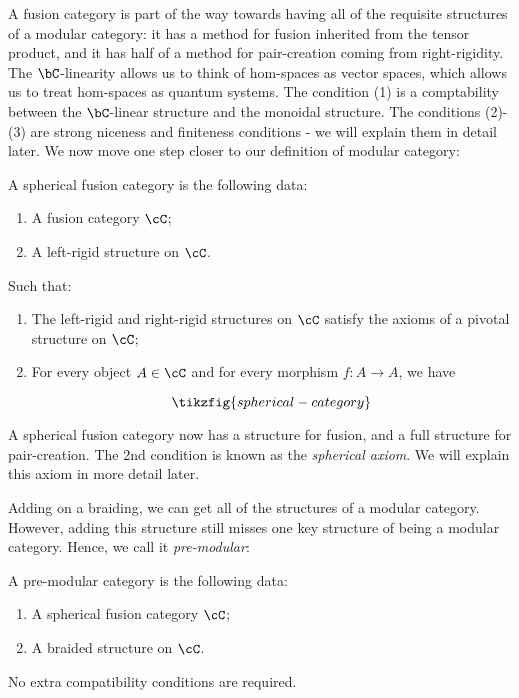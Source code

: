 A fusion category is part of the way towards having all of the requisite structures of a modular category: it has a method for fusion inherited from the tensor product, and it has half of a method for pair-creation coming from right-rigidity. The $\bC$-linearity allows us to think of hom-spaces as vector spaces, which allows us to treat hom-spaces as quantum systems. The condition (1) is a comptability between the $\bC$-linear structure and the monoidal structure. The conditions (2)-(3) are strong niceness and finiteness conditions - we will explain them in detail later. We now move one step closer to our definition of modular category:

\begin{defn} A spherical fusion category is the following data:

\begin{enumerate}
\item A fusion category $\cC$;
\item A left-rigid structure on $\cC$.
\end{enumerate}

Such that:

\begin{enumerate}
\item The left-rigid and right-rigid structures on $\cC$ satisfy the axioms of a pivotal structure on $\cC$;
\item For every object $A\in \cC$ and for every morphism $f: A \to A$, we have

\begin{equation*}
\tikzfig{spherical-category}
\end{equation*}
\end{enumerate}

\raggedleft\qedsymbol{}
\end{defn}

A spherical fusion category now has a structure for fusion, and a full structure for pair-creation. The 2nd condition is known as the \textit{spherical axiom}. We will explain this axiom in more detail later.

Adding on a braiding, we can get all of the structures of a modular category. However, adding this structure still misses one key structure of being a modular category. Hence, we call it \textit{pre-modular}:

\begin{defn} A pre-modular category is the following data:

\begin{enumerate}
\item A spherical fusion category $\cC$;
\item A braided structure on $\cC$.
\end{enumerate}

No extra compatibility conditions are required.

\raggedleft\qedsymbol{}
\end{defn}

